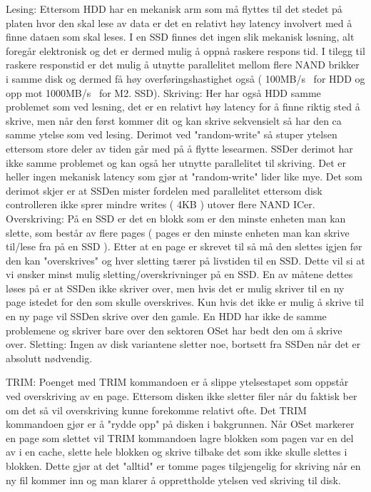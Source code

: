 \documentclass[11pt]{article}
\begin{document}
Lesing:
Ettersom HDD har en mekanisk arm som må flyttes til det stedet på platen hvor den skal lese av data er det en relativt høy latency involvert med å finne dataen som skal leses. I en SSD finnes det ingen slik mekanisk løsning, alt foregår elektronisk og det er dermed mulig å oppnå raskere respons tid. I tilegg til raskere responstid er det mulig å utnytte parallelitet mellom flere NAND brikker i samme disk og dermed få høy overføringshastighet også ( 100MB/s~ for HDD og opp mot 1000MB/s~ for M2. SSD).
Skriving:
Her har også HDD samme problemet som ved lesning, det er en relativt høy latency for å finne riktig sted å skrive, men når den først kommer dit og kan skrive sekvensielt så har den ca samme ytelse som ved lesing. Derimot ved "random-write" så stuper ytelsen ettersom store deler av tiden går med på å flytte lesearmen. SSDer derimot har ikke samme problemet og kan også her utnytte parallelitet til skriving. Det er heller ingen mekanisk latency som gjør at "random-write" lider like mye. Det som derimot skjer er at SSDen mister fordelen med parallelitet ettersom disk controlleren ikke sprer mindre writes ( 4KB ) utover flere NAND ICer. 
Overskriving:
På en SSD er det en blokk som er den minste enheten man kan slette, som består av flere pages ( pages er den minste enheten man kan skrive til/lese fra på en SSD ). Etter at en page er skrevet til så må den slettes igjen før den kan "overskrives" og hver sletting tærer på livstiden til en SSD. Dette vil si at vi ønsker minst mulig sletting/overskrivninger på en SSD. En av måtene dettes løses på er at SSDen ikke skriver over, men hvis det er mulig skriver til en ny page istedet for den som skulle overskrives. Kun hvis det ikke er mulig å skrive til en ny page vil SSDen skrive over den gamle.
En HDD har ikke de samme problemene og skriver bare over den sektoren OSet har bedt den om å skrive over.
Sletting:
Ingen av disk variantene sletter noe, bortsett fra SSDen når det er absolutt nødvendig.

TRIM:
Poenget med TRIM kommandoen er å slippe ytelsestapet som oppstår ved overskriving av en page. Ettersom disken ikke sletter filer når du faktisk ber om det så vil overskriving kunne forekomme relativt ofte. Det TRIM kommandoen gjør er å "rydde opp" på disken i bakgrunnen. Når OSet markerer en page som slettet vil TRIM kommandoen lagre blokken som pagen var en del av i en cache, slette hele blokken og skrive tilbake det som ikke skulle slettes i blokken. Dette gjør at det "alltid" er tomme pages tilgjengelig for skriving når en ny fil kommer inn og man klarer å opprettholde ytelsen ved skriving til disk.
\end{document}
